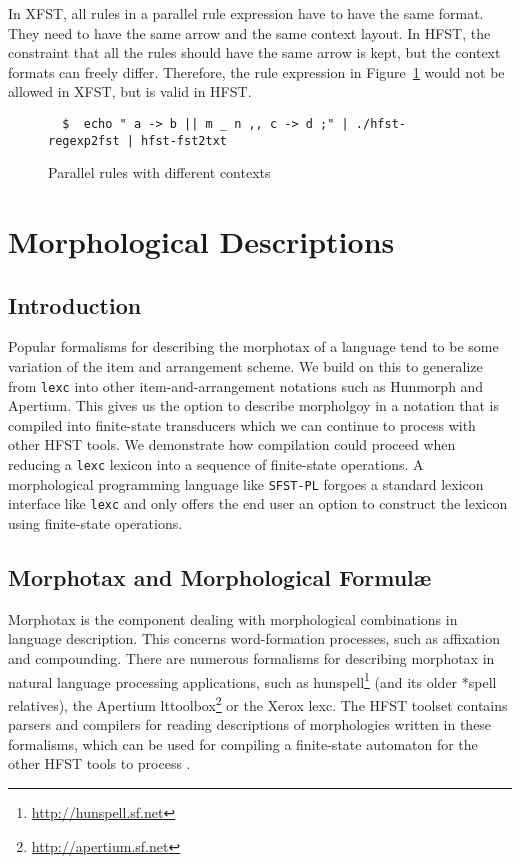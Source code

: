 \documentclass{llncs}
\begin{document}
In XFST, all rules in a parallel rule expression have to have the same format. 
They need to have the same arrow and the same context layout. 
In HFST, the constraint that all the rules should have the same arrow is kept, 
but the context formats can freely differ. 
Therefore, the rule expression in Figure~\ref{fig:parallel_rules} 
would not be allowed in XFST, but is valid in HFST.
\begin{figure}
\begin{verbatim}
  $  echo " a -> b || m _ n ,, c -> d ;" | ./hfst-regexp2fst | hfst-fst2txt
\end{verbatim}
\caption{Parallel rules with different contexts}
\label{fig:parallel_rules}
\end{figure}

\section{Morphological Descriptions}\label{MorphTools}

\subsection{Introduction}

Popular formalisms for describing the morphotax of a language tend to be some variation 
of the item and arrangement scheme. We build on this to generalize from \verb!lexc! into other
item-and-arrangement notations such as Hunmorph and Apertium. This gives us the option to describe 
morpholgoy in a notation that is compiled into finite-state transducers which we can continue to process with other
HFST tools. We demonstrate how compilation could proceed when reducing a \verb!lexc! lexicon into a sequence of
finite-state operations. A morphological programming language like \verb!SFST-PL! forgoes a standard lexicon interface
like \verb!lexc! and only offers the end user an option to construct the lexicon using finite-state operations.

\subsection{Morphotax and Morphological Formul\ae}

Morphotax is the component dealing with morphological combinations
in language description. This concerns word-formation processes, such as affixation and compounding. 
There are numerous formalisms for describing morphotax in natural language processing applications, 
such as hunspell\footnote{\url{http://hunspell.sf.net}} (and its older *spell relatives),
the Apertium lttoolbox\footnote{\url{http://apertium.sf.net}}
or the Xerox lexc\cite{beesley/2003}. The HFST toolset contains parsers and compilers 
for reading descriptions of morphologies written in these formalisms, which can be used for 
compiling a finite-state automaton for the other HFST tools to process 
\cite{pirinen/2010/il,linden/2009/sfcm}.
\end{document}
